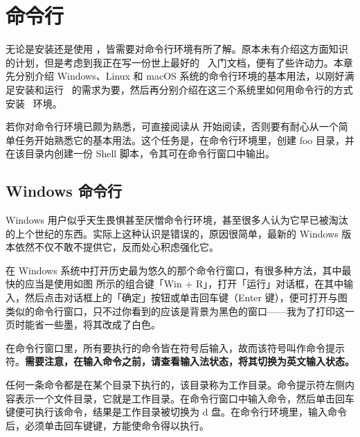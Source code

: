 \chapter[Installation]{命令行}

无论是安装还是使用 \CONTEXT，皆需要对命令行环境有所了解。原本未有介绍这方面知识的计划，但是考虑到我正在写一份世上最好的 \CONTEXT\ 入门文档，便有了些许动力。本章先分别介绍 Windows、Linux 和 macOS 系统的命令行环境的基本用法，以刚好满足安装和运行 \CONTEXT\ 的需求为要，然后再分别介绍在这三个系统里如何用命令行的方式安装 \CONTEXT\ 环境。

若你对命令行环境已颇为熟悉，可直接阅读从 \in[installation] 开始阅读，否则要有耐心从一个简单任务开始熟悉它的基本用法。这个任务是，在命令行环境里，创建 foo 目录，并在该目录内创建一份 Shell 脚本，令其可在命令行窗口中输出。

\section{Windows 命令行}

Windows 用户似乎天生畏惧甚至厌憎命令行环境，甚至很多人认为它早已被淘汰的上个世纪的东西。实际上这种认识是错误的，原因很简单，最新的 Windows 版本依然不仅不敢不提供它，反而处心积虑强化它。

在 Windows 系统中打开历史最为悠久的那个命令行窗口，有很多种方法，其中最快的应当是使用如图 \in[win-r] 所示的组合键「Win + R」，打开「运行」对话框，在其中输入，然后点击对话框上的「确定」按钮或单击回车键（Enter 键），便可打开与图  类似的命令行窗口，只不过你看到的应该是背景为黑色的窗口——我为了打印这一页时能省一些墨，将其改成了白色。

\startplacefigure[location=none]
\startfloatcombination[nx=2,ny=1]
\startplacefigure[title={Win + R 组合键},reference=win-r]
\stopplacefigure
\startplacefigure[title={Windows 命令行窗口},reference=cmd-window]
\stopplacefigure
\stopfloatcombination
\stopplacefigure

在命令行窗口里，所有要执行的命令皆在\boxquote{\type{>}}符号后输入，故而该符号叫作命令提示符。{\bf 需要注意，在输入命令之前，请查看输入法状态，将其切换为英文输入状态。}

任何一条命令都是在某个目录下执行的，该目录称为工作目录。命令提示符左侧内容表示一个文件目录，它就是工作目录。在命令行窗口中输入命令，然后单击回车键便可执行该命令，结果是工作目录被切换为 d 盘。在命令行环境里，输入命令后，必须单击回车键键，方能使命令得以执行。

